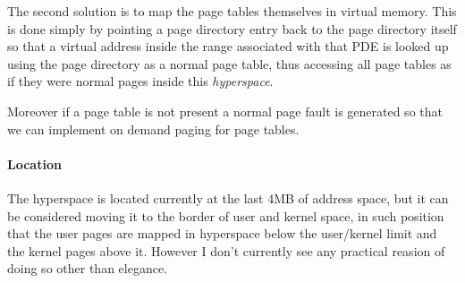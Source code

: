 The second solution is to map the page tables themselves in virtual memory.
This is done simply by pointing a page directory entry back to the page directory itself
so that a virtual address inside the range associated with that PDE is looked up using
the page directory as a normal page table, thus accessing all page tables as if they were normal 
pages inside this \emph{hyperspace}.

Moreover if a page table is not present a normal page fault is generated so that
we can implement on demand paging for page tables.

\paragraph{Location}

The hyperspace is located currently at the last 4MB of address space,
but it can be considered moving it to the border of user and kernel space, in such position
that the user pages are mapped in hyperspace below the user/kernel limit and the kernel
pages above it. However I don't currently see any practical reasion of doing so
other than elegance.








